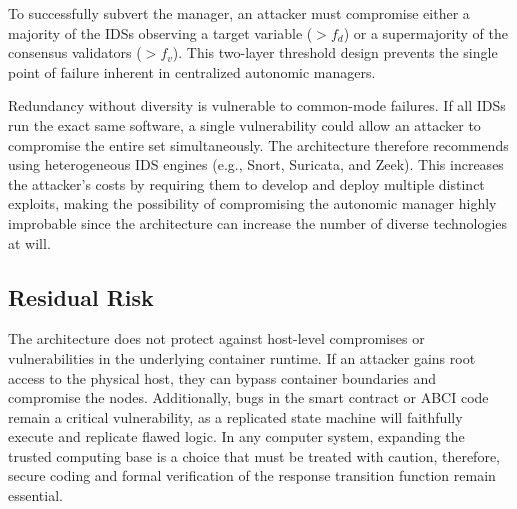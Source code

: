 To successfully subvert the manager, an attacker must compromise either a majority of the IDSs observing a target variable ($> f_d$) or a supermajority of the consensus validators ($> f_v$). This two-layer threshold design prevents the single point of failure inherent in centralized autonomic managers.

Redundancy without diversity is vulnerable to common-mode failures. If all IDSs run the exact same software, a single vulnerability could allow an attacker to compromise the entire set simultaneously. The architecture therefore recommends using heterogeneous IDS engines (e.g., Snort, Suricata, and Zeek). This increases the attacker's costs by requiring them to develop and deploy multiple distinct exploits, making the possibility of compromising the autonomic manager highly improbable since the architecture can increase the number of diverse technologies at will.

\subsection{Residual Risk}
\label{subsec:residual_risk}

The architecture does not protect against host-level compromises or vulnerabilities in the underlying container runtime. If an attacker gains root access to the physical host, they can bypass container boundaries and compromise the nodes. Additionally, bugs in the smart contract or ABCI code remain a critical vulnerability, as a replicated state machine will faithfully execute and replicate flawed logic. In any computer system, expanding the trusted computing base is a choice that must be treated with caution, therefore, secure coding and formal verification of the response transition function remain essential.
